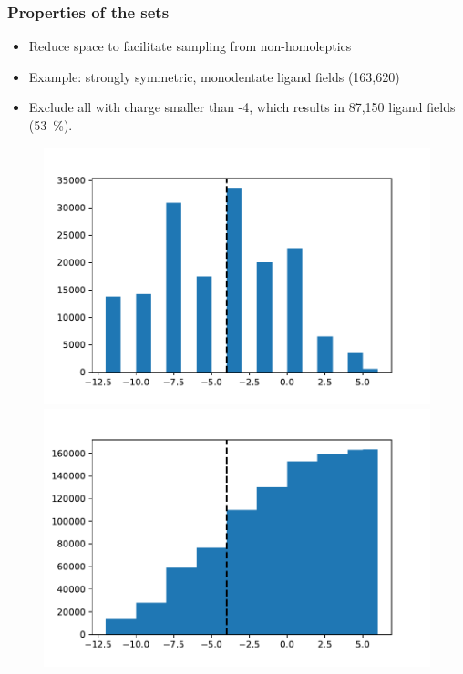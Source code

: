\documentclass[xcolor=dvipsnames]{beamer}
\begin{document}
\begin{frame}
\frametitle{Properties of the sets}
\begin{itemize}
\item Reduce space to facilitate sampling from non-homoleptics
\item Example: strongly symmetric, monodentate ligand fields (163,620)
\item Exclude all with charge smaller than -4, which results in 87,150 ligand fields (53~\%).
\end{itemize}

\begin{figure}[ht] 
	\begin{minipage}[b]{0.5\linewidth}
		\centering
		\includegraphics[width=.9\linewidth]{img/strongsymMonodentates_chargeHist.pdf} 
	\end{minipage}%
	\begin{minipage}[b]{0.5\linewidth}
		\centering
		\includegraphics[width=.9\linewidth]{img/strongsymMonodentates_chargeHistCum.pdf} 
	\end{minipage} 
\end{figure}
\end{frame}
\end{document}
